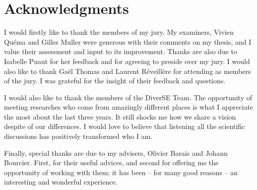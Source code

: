 \thispagestyle{empty}\addtocounter{page}{-1}
\chapter*{Acknowledgments}
\thispagestyle{empty}\addtocounter{page}{-1}

I would firstly like to thank the members of my jury.
My examiners, Vivien Qu\'ema and Gilles Muller were generous with their 
comments on my thesis, and I value their assessment and input to its improvement.
Thanks are also due to Isabelle Puaut for her feedback and for agreeing
to preside over my jury.
I would also like to thank Ga\"el Thomas and Laurent R\'eveill\`ere for attending as members of the jury.
I was grateful for the insight of their feedback and questions.

I would also like to thank the members of the DiverSE Team.
The opportunity of meeting researches who come from amazingly different places is
what I appreciate the most about the last three years.
It still shocks me how we share a vision despite of our differences.
I would love to believe that listening all the scientific discussions has positively transformed
who I am. 

Finally, special thanks are due to my advisers, Olivier Barais and Johann Bourcier.
First, for their useful advices, and second for offering me the opportunity of working
with them; it has been -- for many good reasons -- an interesting and wonderful experience.    


